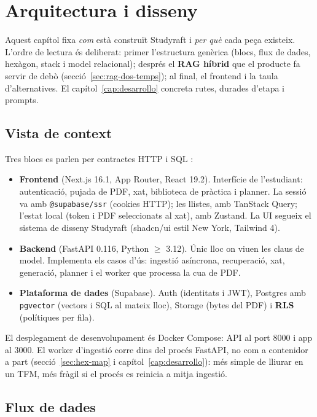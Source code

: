 \chapter{Arquitectura i disseny}
\label{cap:arquitectura}

Aquest capítol fixa \emph{com} està construït Studyraft i \emph{per què} cada peça existeix. L'ordre de lectura és deliberat: primer l'estructura genèrica (blocs, flux de dades, hexàgon, stack i model relacional); després el \textbf{RAG híbrid} que el producte fa servir de debò (secció~\ref{sec:rag-dos-temps}); al final, el frontend i la taula d'alternatives. El capítol~\ref{cap:desarrollo} concreta rutes, durades d'etapa i prompts.

\section{Vista de context}
\label{sec:context}

Tres blocs es parlen per contractes HTTP i SQL \parencite{fastapi,nextjs,supabase,pgvector}:

\begin{itemize}
  \item \textbf{Frontend} (Next.js 16.1, App Router, React 19.2). Interfície de l'estudiant: autenticació, pujada de PDF, xat, biblioteca de pràctica i planner. La sessió va amb \texttt{@supabase/ssr} (cookies HTTP); les llistes, amb TanStack Query; l'estat local (token i PDF seleccionats al xat), amb Zustand. La UI segueix el sistema de disseny Studyraft (shadcn/ui estil New York, Tailwind 4).
  \item \textbf{Backend} (FastAPI 0.116, Python $\geq$ 3.12). Únic lloc on viuen les claus de model. Implementa els casos d'ús: ingestió asíncrona, recuperació, xat, generació, planner i el worker que processa la cua de PDF.
  \item \textbf{Plataforma de dades} (Supabase). Auth (identitats i JWT), Postgres amb \texttt{pgvector} (vectors i SQL al mateix lloc), Storage (bytes del PDF) i \textbf{RLS} (polítiques per fila).
\end{itemize}

El desplegament de desenvolupament és Docker Compose: API al port 8000 i app al 3000. El worker d'ingestió corre dins del procés FastAPI, no com a contenidor a part (secció~\ref{sec:hex-map} i capítol~\ref{cap:desarrollo}): més simple de lliurar en un TFM, més fràgil si el procés es reinicia a mitja ingestió.

\section{Flux de dades}
\label{sec:flux}

